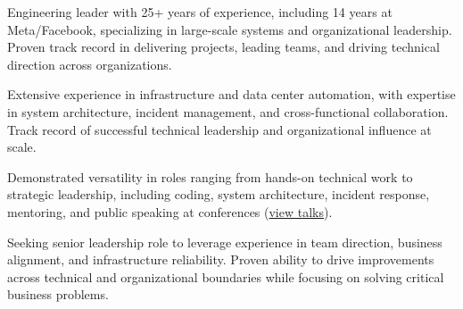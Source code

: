 

\begin{cvparagraph}

    Engineering leader with 25+ years of experience, including 14 years at Meta/Facebook,
    specializing in large-scale systems and organizational leadership. Proven track record
    in delivering projects, leading teams, and driving technical direction across organizations.

    Extensive experience in infrastructure and data center automation,
    with expertise in
    system architecture, incident management, and cross-functional collaboration.
    Track record of successful technical leadership and organizational influence at scale.

    Demonstrated versatility in roles ranging from hands-on technical work to strategic
    leadership, including coding, system architecture, incident response, mentoring,
    and public speaking at conferences (\href{https://www.angelofailla.com/public_talks/}{view talks}).

    Seeking senior leadership role to leverage experience in team direction, business alignment,
    and infrastructure reliability. Proven ability to drive improvements across technical
    and organizational boundaries while focusing on solving critical business problems.
\end{cvparagraph}

